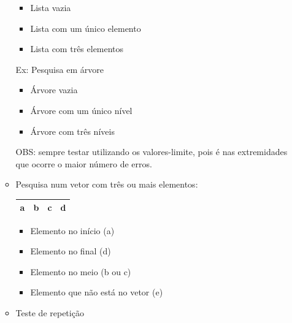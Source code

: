 \documentclass[
	12pt, %
]{fphw}
\begin{document}
\begin{doublespace}
\begin{enumerate}[label=\textbf{\arabic*)}]
\begin{itemize}
\begin{itemize}
                            \item Lista vazia
                            \item Lista com um único elemento
                            \item Lista com três elementos

                        \end{itemize}

                        Ex: Pesquisa em árvore

                        \begin{itemize}

                            \item Árvore vazia
                            \item Árvore com um único nível
                            \item Árvore com três níveis

                        \end{itemize}

                        OBS: sempre testar utilizando os valores-limite, pois é nas extremidades que ocorre o maior número de erros.

                  \item Pesquisa num vetor com três ou mais elementos:
                        \begin{center}
                            \begin{tabular}{ | c | c | c | c | }
                                \hline
                                a & b & c & d \\
                                \hline
                            \end{tabular}
                        \end{center}


                        \begin{itemize}
                            \item Elemento no início (a)
                            \item Elemento no final (d)
                            \item Elemento no meio (b ou c)
                            \item Elemento que não está no vetor (e)
                        \end{itemize}

                  \item Teste de repetição


\end{itemize}
\end{enumerate}
\end{doublespace}
\end{document}
